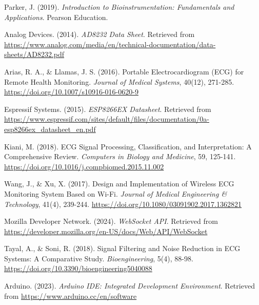 
\begin{thebibliography}{9}
Parker, J. (2019). \textit{Introduction to Bioinstrumentation: Fundamentals and Applications}. Pearson Education.

Analog Devices. (2014). \textit{AD8232 Data Sheet}. Retrieved from \url{https://www.analog.com/media/en/technical-documentation/data-sheets/AD8232.pdf}

Arias, R. A., \& Llamas, J. S. (2016). Portable Electrocardiogram (ECG) for Remote Health Monitoring. \textit{Journal of Medical Systems}, 40(12), 271-285. \url{https://doi.org/10.1007/s10916-016-0620-9}

Espressif Systems. (2015). \textit{ESP8266EX Datasheet}. Retrieved from \url{https://www.espressif.com/sites/default/files/documentation/0a-esp8266ex_datasheet_en.pdf}

Kiani, M. (2018). ECG Signal Processing, Classification, and Interpretation: A Comprehensive Review. \textit{Computers in Biology and Medicine}, 59, 125-141. \url{https://doi.org/10.1016/j.compbiomed.2015.11.002}

Wang, J., \& Xu, X. (2017). Design and Implementation of Wireless ECG Monitoring System Based on Wi-Fi. \textit{Journal of Medical Engineering \& Technology}, 41(4), 239-244. \url{https://doi.org/10.1080/03091902.2017.1362821}

Mozilla Developer Network. (2024). \textit{WebSocket API}. Retrieved from \url{https://developer.mozilla.org/en-US/docs/Web/API/WebSocket}

Tayal, A., \& Soni, R. (2018). Signal Filtering and Noise Reduction in ECG Systems: A Comparative Study. \textit{Bioengineering}, 5(4), 88-98. \url{https://doi.org/10.3390/bioengineering5040088}

Arduino. (2023). \textit{Arduino IDE: Integrated Development Environment}. Retrieved from \url{https://www.arduino.cc/en/software}

\end{thebibliography}